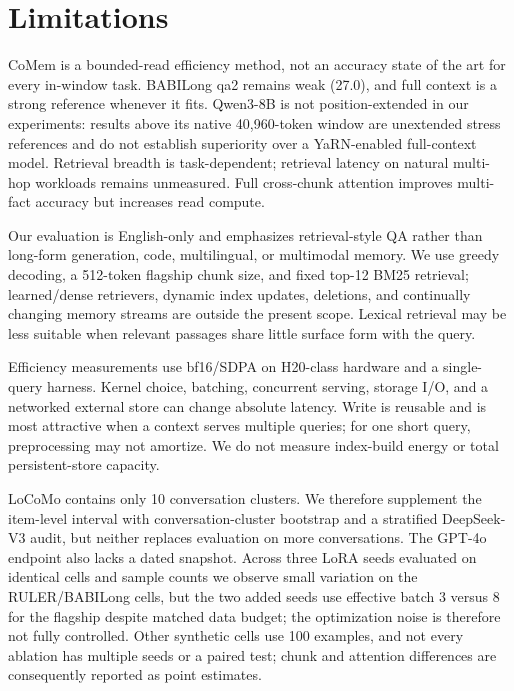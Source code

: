 \section{Limitations}
\label{sec:limitations}
CoMem is a bounded-read efficiency method, not an accuracy state of the art for
every in-window task. BABILong qa2 remains weak (27.0), and full context is a
strong reference whenever it fits. Qwen3-8B is not position-extended in our
experiments: results above its native 40,960-token window are unextended stress
references and do not establish superiority over a YaRN-enabled full-context
model. Retrieval breadth is task-dependent; retrieval latency on natural
multi-hop workloads remains unmeasured. Full cross-chunk attention improves
multi-fact accuracy but increases read compute.

Our evaluation is English-only and emphasizes retrieval-style QA rather than
long-form generation, code, multilingual, or multimodal memory. We use greedy
decoding, a 512-token flagship chunk size, and fixed top-12 BM25 retrieval;
learned/dense retrievers, dynamic index updates, deletions, and continually
changing memory streams are outside the present scope. Lexical retrieval may be
less suitable when relevant passages share little surface form with the query.

Efficiency measurements use bf16/SDPA on H20-class hardware and a single-query
harness. Kernel choice, batching, concurrent serving, storage I/O, and a
networked external store can change absolute latency. Write is reusable and is
most attractive when a context serves multiple queries; for one short query,
preprocessing may not amortize. We do not measure index-build energy or total
persistent-store capacity.

LoCoMo contains only 10 conversation clusters. We therefore supplement the
item-level interval with conversation-cluster bootstrap and a stratified
DeepSeek-V3 audit, but neither replaces evaluation on more conversations.
The GPT-4o endpoint also lacks a dated snapshot. Across three LoRA seeds
evaluated on identical cells and sample counts we observe small variation on the
RULER/BABILong cells, but the two added seeds use effective batch 3 versus 8 for
the flagship despite matched data budget; the optimization noise is therefore
not fully controlled. Other synthetic cells use 100 examples, and not
every ablation has multiple seeds or a paired test; chunk and attention
differences are consequently reported as point estimates.
